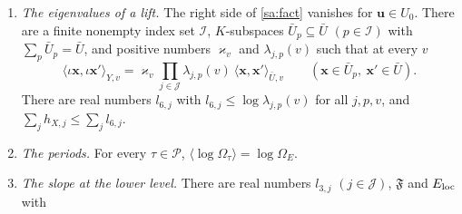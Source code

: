 \documentclass[11pt,letterpaper]{article}
\begin{document}
\begin{enumerate}[label=\textup{(S\arabic*)},leftmargin=2.8em,itemsep=3pt,topsep=3pt]
\begin{gather}\label{D:255}
 h_\Pi\le-\sum_{\tau\in\mathcal P}\ell_\tau\log\mathcal T
   +\sum_{\tau\in\mathcal P}\big(2\,\mathfrak m_\tau+\mathfrak m_\tau'\big)+e_\Pi,\qquad
 \ell_\tau=\lambda_{1,\tau}-d_{0,\tau},\\
 \lambda_{1,\tau}=a_\tau-\tfrac{N_m-k}2\ (\tau\in T),\qquad
 \lambda_{1,\tau}\ge S_{\rm c}-\tfrac{N_m-1}2\ (\tau\notin T),\\
 d_{0,\tau}\le S_{\rm c}+m\eta+[\tau\in T]\,b_\tau,\quad b_\tau\le2b'\ (\tau\in T),\quad
 d_{1,\tau}\le3d_{0,\tau}+S_{\rm c}+\eta,\\
 \mathfrak m_\tau\le(N_m-1)\,d_{1,\tau}\log(2a),\quad\mathfrak m_\tau'\le\tfrac{N_m(N_m-1)}2\log(2a),\quad
 e_\Pi\le C_\Pi fN_m^2L_a,
\end{gather}
and $2(16+C_T+C_\Pi)\le C_h$. The number $e_\Pi$ is one real number; it does not depend on $v$. We read
the first line as the bound of the paragraph ``The pairing at the end of the chain'' of \S III.4 at the
place $\tau$, with $\psi\le N_m-1$, $\Psi\le N_m$ and $\Gamma\le2a$, and with $\mathfrak m_\tau$,
$\mathfrak m_\tau'$ in the place of $\log|\vartheta|$, $\log\kappa$ there. This reading is ours: in the
source $\mathfrak m_\tau$ and $\mathfrak m_\tau'$ are by definition the two majorants
$(N_m-1)\,d_{1,\tau}\log(2a)$ and $\frac{N_m(N_m-1)}2\log(2a)$ (Lean: \texttt{logc}, \texttt{logxi} in
\texttt{lastSide\_of\_logT\_le}).
\item \emph{The eigenvalues of a lift.} The right side of \eqref{sa:fact} vanishes for
$\mathbf u\in U_0$. There are a finite nonempty index set $\mathcal I$, $K$-subspaces
$\bar U_p\subseteq\bar U$ $(p\in\mathcal I)$ with $\sum_p\bar U_p=\bar U$, and positive numbers
$\varkappa_v$ and $\lambda_{j,p}(v)$ such that at every $v$
\begin{equation}\label{D:256}
 \langle\iota\mathbf x,\iota\mathbf x'\rangle_{Y,v}
 =\varkappa_v\prod_{j\in\mathcal J}\lambda_{j,p}(v)\ \langle\mathbf x,\mathbf x'\rangle_{\bar U,v}
 \qquad(\mathbf x\in\bar U_p,\ \mathbf x'\in\bar U).
\end{equation}
There are real numbers $l_{6,j}$ with $l_{6,j}\le\log\lambda_{j,p}(v)$ for all $j,p,v$, and
$\sum_jh_{X,j}\le\sum_jl_{6,j}$.
\item \emph{The periods.} For every $\tau\in\mathcal P$, $\langle\log\Omega_\tau\rangle=\log\Omega_E$.
\item \emph{The slope at the lower level.} There are real numbers $l_{3,j}$ $(j\in\mathcal J)$,
$\mathfrak F$ and $E_{\rm loc}$ with
\begin{equation}\label{D:257}

\end{equation}
\end{enumerate}
\end{document}
